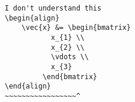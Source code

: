 \begin{verbatim}
I don't understand this
\begin{align}
    \vec{x} &= \begin{bmatrix}
           x_{1} \\
           x_{2} \\
           \vdots \\
           x_{3}
         \end{bmatrix}
\end{align}
~~~~~~~~~~~~~~~~~^
\end{verbatim}
